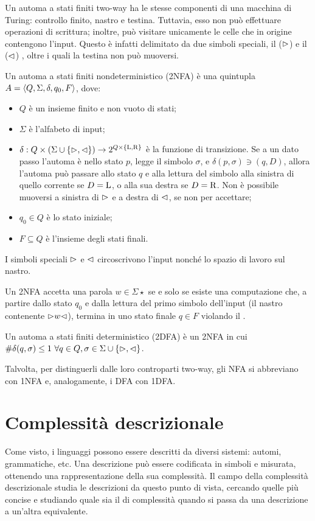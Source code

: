 Un automa a stati finiti two-way ha le stesse componenti di una macchina di Turing: controllo finito, nastro e testina. Tuttavia, esso non può effettuare operazioni di scrittura; inoltre, può visitare unicamente le celle che in origine contengono l'input. Questo è infatti delimitato da due simboli speciali, il  ($\rhd$) e il  ($\lhd$) , oltre i quali la testina non può muoversi.
\begin{defin}
	Un automa a stati finiti  nondeterministico (2NFA) è una quintupla $A=\langle Q,\Sigma,\delta,q_0,F \rangle$, dove:
	\begin{itemize}
		\item $Q$ è un insieme finito e non vuoto di stati;
		\item $\Sigma$ è l'alfabeto di input;
		\item $\delta:Q\times(\Sigma\cup\left\{ \rhd,\lhd \right\})\to2^{Q\times\left\{ \mathrm L,\mathrm R \right\}}$ è la funzione di transizione. Se a un dato passo l'automa è nello stato $p$, legge il simbolo $\sigma$, e $\delta(p,\sigma)\ni (q,D)$, allora l'automa può passare allo stato $q$ e alla lettura del simbolo alla sinistra di quello corrente se $D=\mathrm L$, o alla sua destra se $D=\mathrm R$. Non è possibile muoversi a sinistra di $\rhd$ e a destra di $\lhd$, se non per accettare;
		\item $q_0\in Q$ è lo stato iniziale;
		\item $F\subseteq Q$ è l'insieme degli stati finali.
	\end{itemize}
	I simboli speciali $\rhd$ e $\lhd$ circoscrivono l'input nonché lo spazio di lavoro sul nastro.

	Un 2NFA accetta una parola $w\in\Sigma\star$ se e solo se esiste una computazione che, a partire dallo stato $q_0$ e dalla lettura del primo simbolo dell'input (il nastro contenente $\rhd w\lhd$), termina in uno stato finale $q\in F$ violando il .
\end{defin}

\begin{defin}
	Un automa a stati finiti  deterministico (2DFA) è un 2NFA in cui $\# \delta(q,\sigma)\leq 1 ~ \forall q\in Q,\sigma\in\Sigma\cup\left\{ \rhd,\lhd \right\}$.
\end{defin}

Talvolta, per distinguerli dalle loro controparti two-way, gli NFA  si abbreviano con 1NFA e, analogamente, i DFA con 1DFA.


\section{Complessità descrizionale}
Come visto, i linguaggi possono essere descritti da diversi sistemi: automi, grammatiche, etc. Una descrizione può essere codificata in simboli e misurata, ottenendo una rappresentazione della sua complessità. Il campo della complessità descrizionale studia le descrizioni da questo punto di vista, cercando quelle più concise e studiando quale sia il  di complessità quando si passa da una descrizione a un'altra equivalente.

